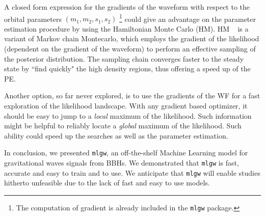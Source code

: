 A closed form expression for the gradients of the waveform with respect to the orbital parameters $(m_1,m_2, {s}_1,{s}_2)$
\footnote{The computation of gradient is already included in the \texttt{mlgw} package.}
could give an advantage on the parameter estimation procedure by using the Hamiltonian Monte Carlo (HM).
HM \cite{betancourt2017hamiltonianMC}~\cite{Porter2014Hamiltonian_MonteCarlo} is a variant of Markov chain 
Montecarlo, which employs the gradient of the likelihood (dependent on the gradient of the waveform) 
to perform an effective sampling of the posterior distribution. The sampling chain converges faster to 
the steady state by ``find quickly" the high density regions, thus offering a speed up of the PE.

Another option, so far never explored, is to use the gradients of the WF for a fast exploration of the likelihood landscape. 
With any gradient based optimizer, it should be easy to jump to a \textit{local} maximum of the likelihood. 
Such information might be helpful to reliably locate a \textit{global} maximum of the likelihood.
Such ability could speed up the searches as well as the parameter estimation.

In conclusion, we presented \texttt{mlgw}, an off-the-shelf Machine Learning model for gravitational waves signals from BBHs. 
We demonstrated that \texttt{mlgw} is fast, accurate and easy to train and to use. We anticipate 
that \texttt{mlgw} will enable studies hitherto unfeasible due to the lack of fast and easy to use models.






